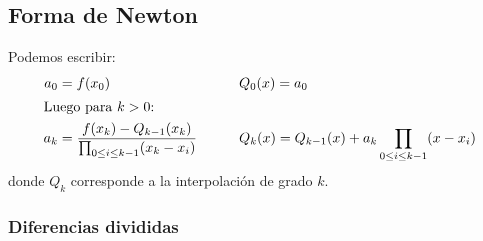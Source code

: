 \subsection{Forma de Newton}
\label{sec:Newton-interpolation}

  Podemos escribir:
  \begin{alignat}{2}
    a_0
     &= f(x_0)
     &\qquad&
     Q_0(x)
       = a_0 \notag \\
  \intertext{Luego para \(k > 0\):}
     a_k
      &= \frac{f(x_k) - Q_{k - 1}(x_k)}
              {\prod_{0 \le i \le k - 1}(x_k - x_i)}
      &&
      Q_k(x)
        = Q_{k - 1}(x) + a_k \prod_{0 \le i \le k - 1} (x - x_i)
           \label{eq:interpolacion-Newton}
  \end{alignat}
  donde \(Q_k\) corresponde a la interpolación de grado \(k\).

\subsubsection{Diferencias divididas}
\label{divided-differences}

